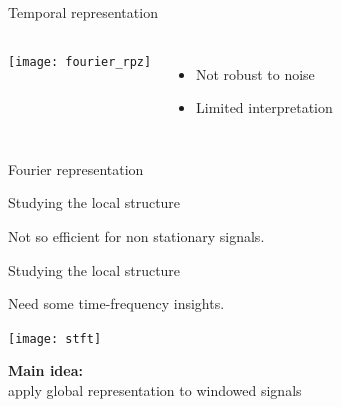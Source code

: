 \documentclass[ignorenonframetext]{beamer}
\begin{document}
\begin{frame}{Temporal representation}
	\begin{columns}[c]
		\texttt{[image: fourier\_rpz]}
		{\large
		\begin{itemize}\itemsep2em
			\item Not robust to noise
			\item Limited interpretation
		\end{itemize}
		}
	\end{columns}
	
\end{frame}

\begin{frame}{Fourier representation}
	\begin{center}
	\end{center}
	
\end{frame}



\begin{frame}{Studying the local structure}

	\centering
	{\Large Not so efficient for non stationary signals.\\[1em]}
	\begin{center}
		
	\end{center}

\end{frame}

\begin{frame}{Studying the local structure}

	\centering
	{\Large Need some time-frequency insights.\\[1em]}
	\begin{center}
		\texttt{[image: stft]}
	\end{center}
	
	\Large {\bf Main idea:}\\
	apply global representation to windowed signals

\end{frame}
\end{document}
